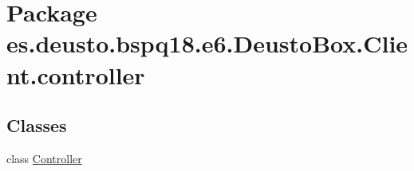 \hypertarget{namespacees_1_1deusto_1_1bspq18_1_1e6_1_1_deusto_box_1_1_client_1_1controller}{}\section{Package es.\+deusto.\+bspq18.\+e6.\+Deusto\+Box.\+Client.\+controller}
\label{namespacees_1_1deusto_1_1bspq18_1_1e6_1_1_deusto_box_1_1_client_1_1controller}
\subsection*{Classes}
\begin{DoxyCompactItemize}
\item 
class \mbox{\hyperlink{classes_1_1deusto_1_1bspq18_1_1e6_1_1_deusto_box_1_1_client_1_1controller_1_1_controller}{Controller}}
\end{DoxyCompactItemize}
